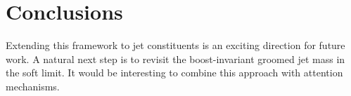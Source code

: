 \section{Conclusions}\label{sec:conclusions}

Extending this framework to jet constituents is an exciting direction
for future work. A natural next step is to revisit the boost-invariant
groomed jet mass in the soft limit. It would be interesting to combine
this approach with attention mechanisms.

